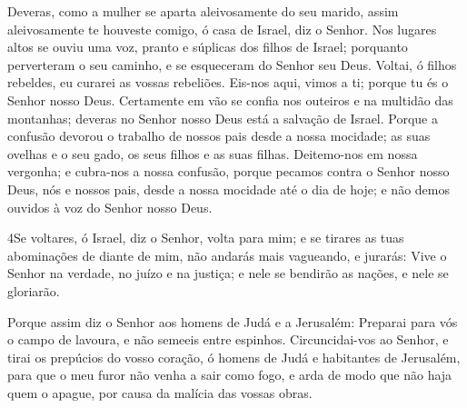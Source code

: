Deveras, como a mulher se aparta aleivosamente do seu marido,
assim aleivosamente te houveste comigo, ó casa de Israel, diz o
Senhor. Nos lugares altos se ouviu uma voz, pranto e súplicas
dos filhos de Israel; porquanto perverteram o seu caminho, e se
esqueceram do Senhor seu Deus. Voltai, ó filhos rebeldes, eu
curarei as vossas rebeliões. Eis-nos aqui, vimos a ti; porque tu és
o Senhor nosso Deus. Certamente em vão se confia nos outeiros
e na multidão das montanhas; deveras no Senhor nosso Deus está a
salvação de Israel. Porque a confusão devorou o trabalho de
nossos pais desde a nossa mocidade; as suas ovelhas e o seu gado, os
seus filhos e as suas filhas. Deitemo-nos em nossa vergonha;
e cubra-nos a nossa confusão, porque pecamos contra o Senhor nosso
Deus, nós e nossos pais, desde a nossa mocidade até o dia de hoje; e
não demos ouvidos à voz do Senhor nosso Deus.

\medskip

\lettrine{4} Se voltares, ó Israel, diz o Senhor, volta para
mim; e se tirares as tuas abominações de diante de mim, não andarás
mais vagueando, e jurarás: Vive o Senhor na verdade, no juízo e
na justiça; e nele se bendirão as nações, e nele se gloriarão.

Porque assim diz o Senhor aos homens de Judá e a Jerusalém:
Preparai para vós o campo de lavoura, e não semeeis entre espinhos.
Circuncidai-vos ao Senhor, e tirai os prepúcios do vosso
coração, ó homens de Judá e habitantes de Jerusalém, para que o meu
furor não venha a sair como fogo, e arda de modo que não haja quem o
apague, por causa da malícia das vossas obras.

